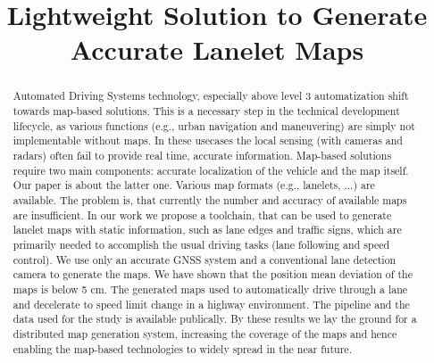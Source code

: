 \documentclass[conference]{IEEEtran}
\begin{document}
\title{Lightweight Solution to Generate Accurate Lanelet Maps\\
}

\author{
\and
{}
\and
{}
}

\maketitle

\begin{abstract}
Automated Driving Systems technology, especially above level 3 automatization shift towards map-based solutions. This is a necessary step in the technical development lifecycle, as various functions (e.g., urban 
navigation and maneuvering) are simply not implementable without maps. In these usecases the local sensing (with cameras and radars) often fail to provide real time, accurate information. Map-based solutions 
require two main components: accurate localization of the vehicle and the map itself. Our paper is about the latter one. Various map formats (e.g., lanelets, ...) are available. The problem is, that currently 
the number and accuracy of available maps are insufficient. In our work we propose a toolchain, that can be used to generate lanelet maps \cite{poggenhans2018lanelet2} with static information, such as lane edges and traffic signs, which 
are primarily needed to accomplish the usual driving tasks (lane following and speed control). We use only an accurate GNSS system and a conventional lane detection camera to generate the maps. We have shown 
that the position mean deviation of the maps is below 5 cm. The generated maps used to automatically drive through a lane and decelerate to speed limit change in a highway environment. The pipeline and the 
data used for the study is available publically. By these results we lay the ground for a distributed map generation system, increasing the coverage of the maps and hence enabling the map-based technologies 
to widely spread in the near future.
\end{abstract}
\end{document}
